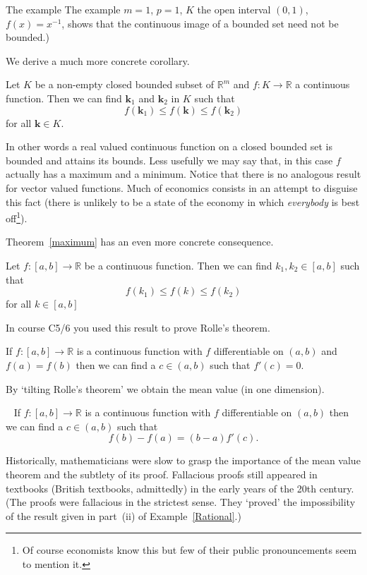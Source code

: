 The example The example $m=1$, $p=1$, $K$ the open
interval $(0,1)$, $f(x)=x^{-1}$,
shows that the continuous image of a bounded
set need not be bounded.)

We derive a much more concrete corollary.
\begin{theorem}\label{maximum}
Let $K$ be a non-empty closed bounded subset of
${\mathbb  R}^{m}$ and $f:K\rightarrow {\mathbb  R}$
a continuous function. Then we can find ${\mathbf k}_{1}$
and ${\mathbf k}_{2}$ in $K$ such that
\[f({\mathbf k}_{1})\leq f({\mathbf k})\leq f({\mathbf k}_{2})\]
for all ${\mathbf k}\in K$.
\end{theorem}
In other words a real valued continuous function on a closed
bounded set is bounded and attains its bounds. Less usefully
we may say that, in this case $f$ actually has a maximum
and a minimum. Notice that there is no analogous result
for vector valued functions.  Much of economics consists
in an attempt to disguise this fact (there is unlikely to
be a state of the economy in which \emph{everybody}  is best
off\footnote{Of course economists know this but few of their
public pronouncements seem to mention it.}).

Theorem~\ref{maximum} has an even more concrete consequence.
\begin{theorem}\label{interval maximum}
Let $f:[a,b]\rightarrow {\mathbb  R}$
be a continuous function. Then we can find $k_{1},k_{2}\in [a,b]$ 
such that
\[f(k_{1})\leq f(k)\leq f(k_{2})\]
for all $k\in [a,b]$
\end{theorem}
In course C5/6 you used this result to prove  Rolle's
theorem.
\begin{theorem} If $f:[a,b]\rightarrow {\mathbb  R}$
is a continuous function with $f$ differentiable on $(a,b)$
and $f(a)=f(b)$ then we can find a $c\in (a,b)$ such that
$f'(c)=0$.
\end{theorem}
By `tilting Rolle's theorem' we obtain the mean value
(in one dimension).
\begin{theorem}~\label{mean}
If $f:[a,b]\rightarrow {\mathbb  R}$
is a continuous function with $f$ differentiable on $(a,b)$
then we can find a $c\in (a,b)$ such that
\[f(b)-f(a)=(b-a)f'(c).\]
\end{theorem}
Historically, mathematicians were slow to grasp the
importance of the mean value theorem and the subtlety 
of its proof. Fallacious proofs still appeared in textbooks
(British textbooks, admittedly) in the early years of the 20th
century. (The proofs were fallacious in the strictest sense.
They `proved' the impossibility of the result given
in part~(ii) of Example~\ref{Rational}.)

